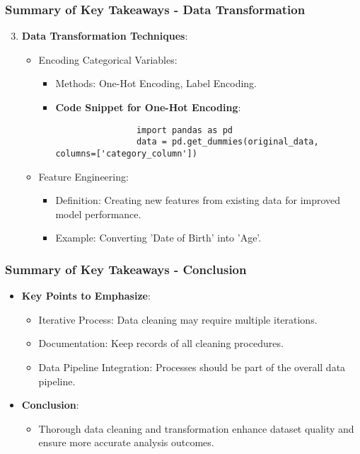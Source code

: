 \documentclass[aspectratio=169]{beamer}
\begin{document}
\begin{frame}[fragile]
    \frametitle{Summary of Key Takeaways - Data Transformation}
    \begin{enumerate}
        \setcounter{enumi}{2} %
        \item \textbf{Data Transformation Techniques}:
        \begin{itemize}
            \item Encoding Categorical Variables:
            \begin{itemize}
                \item Methods: One-Hot Encoding, Label Encoding.
                \item \textbf{Code Snippet for One-Hot Encoding}:
                \begin{lstlisting}
                import pandas as pd
                data = pd.get_dummies(original_data, columns=['category_column'])
                \end{lstlisting}
            \end{itemize}

            \item Feature Engineering:
            \begin{itemize}
                \item Definition: Creating new features from existing data for improved model performance.
                \item Example: Converting 'Date of Birth' into 'Age'.
            \end{itemize}
        \end{itemize}
    \end{enumerate}
\end{frame}

\begin{frame}[fragile]
    \frametitle{Summary of Key Takeaways - Conclusion}
    \begin{itemize}
        \item \textbf{Key Points to Emphasize}:
        \begin{itemize}
            \item Iterative Process: Data cleaning may require multiple iterations.
            \item Documentation: Keep records of all cleaning procedures.
            \item Data Pipeline Integration: Processes should be part of the overall data pipeline.
        \end{itemize}
        
        \item \textbf{Conclusion}:
        \begin{itemize}
            \item Thorough data cleaning and transformation enhance dataset quality and ensure more accurate analysis outcomes.
        \end{itemize}
    \end{itemize}
\end{frame}
\end{document}
